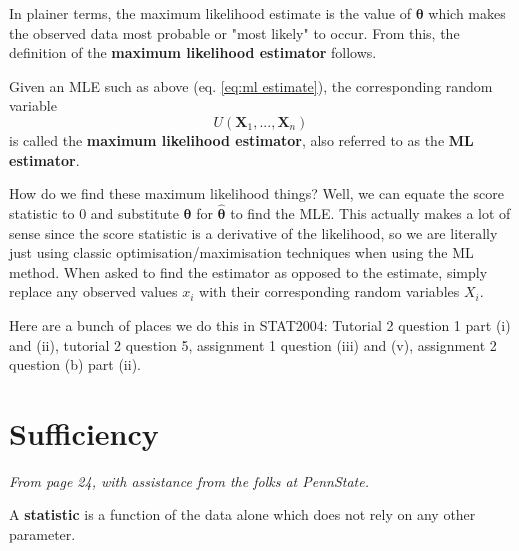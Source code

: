 In plainer terms, the maximum likelihood estimate is the value of \(\bm{\theta}\) which makes the observed data most probable or "most likely" to occur. \autocite{rice}
From this, the definition of the \textbf{maximum likelihood estimator} follows.

\begin{definition}\label{defn:ml estimator}
    Given an MLE such as above (eq. \ref{eq:ml estimate}), the corresponding random variable
    \begin{equation}\label{eq:ml estimator}
        U(\bm{X}_1,...,\bm{X}_n)
    \end{equation}
    is called the \textbf{maximum likelihood estimator}, also referred to as the \textbf{ML estimator}.
\end{definition}

How do we find these maximum likelihood things? 
Well, we can equate the score statistic to \(0\) and substitute \(\bm{\theta}\) for \(\hat{\bm{\theta}}\) to find the MLE. 
This actually makes a lot of sense since the score statistic is a derivative of the likelihood, so we are literally just using classic optimisation/maximisation techniques when using the ML method. 
When asked to find the estimator as opposed to the estimate, simply replace any observed values \(x_i\) with their corresponding random variables \(X_i\).

\begin{exercise}
    Here are a bunch of places we do this in STAT2004: Tutorial 2 question 1 part (i) and (ii), tutorial 2 question 5, assignment 1 question (iii) and (v), assignment 2 question (b) part (ii).
\end{exercise}

\section{Sufficiency}\label{sec:sufficiency}

\textit{From page 24, with assistance from the folks at PennState\autocite{penn415}.}



A \textbf{statistic} is a function of the data alone which does not rely on any other parameter. 


